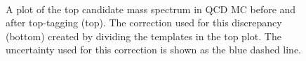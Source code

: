 \begin{figure}[Htcb]
\centering
{}\\
\caption{A plot of the top candidate mass spectrum in QCD MC before and after top-tagging (top).  The correction used for this 
discrepancy (bottom) created by dividing the templates in the top plot.  The uncertainty used for this correction is shown as the blue dashed line.}
\label{figs:bsmodmass}
\end{figure}


